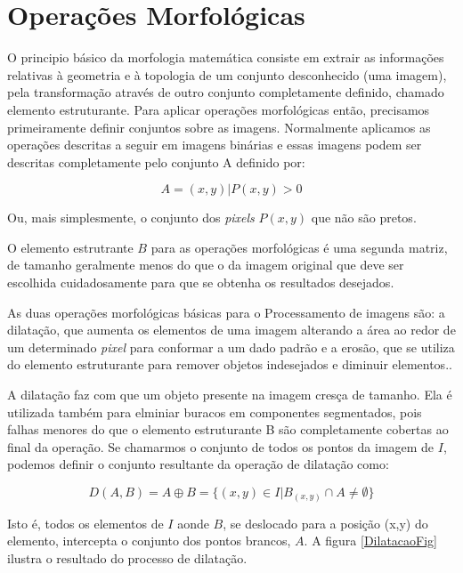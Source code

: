     \section{Operações Morfológicas} \label{morfologicas}
    O principio básico da morfologia matemática consiste em extrair as informações relativas à geometria e à topologia de um conjunto desconhecido (uma imagem), pela transformação através de outro conjunto completamente definido, chamado elemento estruturante.\cite{marques1999processamento} Para aplicar operações morfológicas então, precisamos primeiramente definir conjuntos sobre as imagens. Normalmente aplicamos as operações descritas a seguir em imagens binárias e essas imagens podem ser descritas completamente pelo conjunto A definido por:

    \begin{equation}\label{conjuntoA}
      A = {(x,y)|P(x,y) > 0}
    \end{equation}

    Ou, mais simplesmente, o conjunto dos \textit{pixels} $P(x,y)$ que não são pretos.

    O elemento estrutrante $B$ para as operações morfológicas é uma segunda matriz, de tamanho geralmente menos do que o da imagem original que deve ser escolhida cuidadosamente para que se obtenha os resultados desejados.

    As duas operações morfológicas básicas para o Processamento de imagens são: a dilatação, que aumenta os elementos de uma imagem alterando a área ao redor de um determinado \textit{pixel} para conformar a um dado padrão e a erosão, que se utiliza do elemento estruturante para remover objetos indesejados e diminuir elementos.\cite{de2006introduccao}.

    A dilatação faz com que um objeto presente na imagem cresça de tamanho. Ela é utilizada também para elminiar buracos em componentes segmentados, pois falhas menores do que o elemento estruturante B são completamente cobertas ao final da operação. Se chamarmos o conjunto de todos os pontos da imagem de $I$, podemos definir o conjunto resultante da operação de dilatação como:


    \begin{equation}\label{conjuntoDilatacao}
      D(A,B) = A \oplus B = \{{(x,y) \in I | B_{(x,y)} \cap A \neq \emptyset}\}
    \end{equation}

    Isto é, todos os elementos de $I$ aonde $B$, se deslocado para a posição (x,y) do elemento, intercepta o conjunto dos pontos brancos, $A$. A figura \ref{DilatacaoFig} ilustra o resultado do processo de dilatação.

